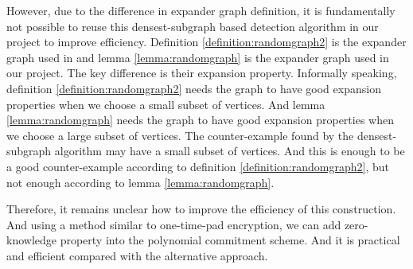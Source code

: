 However, due to the difference in expander graph definition, it is fundamentally not possible to reuse this densest-subgraph based detection algorithm in our project to improve efficiency. Definition \ref{definition:randomgraph2} is the expander graph used in \cite{orion} and lemma \ref{lemma:randomgraph} is the expander graph used in our project. The key difference is their expansion property. Informally speaking, definition \ref{definition:randomgraph2} needs the graph to have good expansion properties when we choose a small subset of vertices. And lemma \ref{lemma:randomgraph} needs the graph to have good expansion properties when we choose a large subset of vertices. The counter-example found by the densest-subgraph algorithm may have a small subset of vertices. And this is enough to be a good counter-example according to definition \ref{definition:randomgraph2}, but not enough according to lemma \ref{lemma:randomgraph}.

Therefore, it remains unclear how to improve the efficiency of this construction. And using a method similar to one-time-pad encryption, we can add zero-knowledge property into the polynomial commitment scheme. And it is practical and efficient compared with the alternative approach.